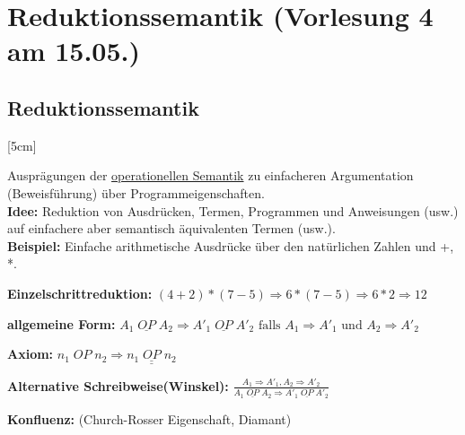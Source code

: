 \section{Reduktionssemantik \small(Vorlesung 4 am 15.05.)}
\subsection{Reduktionssemantik}
[5cm]

Ausprägungen der \underline{operationellen Semantik} zu einfacheren Argumentation (Beweisführung) über Programmeigenschaften.\\
\textbf{Idee:} Reduktion von Ausdrücken, Termen, Programmen und Anweisungen (usw.) auf einfachere aber semantisch äquivalenten Termen (usw.).\\
\textbf{Beispiel:} Einfache arithmetische Ausdrücke über den natürlichen Zahlen und +, *.
\begin{compactitem}
	\item[\textbf{Einzelschrittreduktion:}] $(4+2)*(7-5) \Rightarrow 6 * (7-5) \Rightarrow 6 * 2 \Rightarrow 12$
	\item[\textbf{allgemeine Form:}] $A_1\;\underline{OP}\;A_2 \Rightarrow A'_1\;\underline{OP}\;A'_2 \text{ falls } A_1 \Rightarrow A'_1 \text{ und } A_2 \Rightarrow A'_2$
	\item[\textbf{Axiom:}] $n_1\;OP\;n_2 \Rightarrow \underline{n_1\;\underline{OP}\;n_2}$
	\item[\textbf{Alternative Schreibweise(Winskel):}] $\frac {A_1 \Rightarrow A'_1, A_2 \Rightarrow A'_2} {A_1\;\underline{OP}\;A_2 \Rightarrow A'_1\;\underline{OP}\;A'_2}$
	\item[\textbf{Konfluenz:}] (Church-Rosser Eigenschaft, Diamant)\\
\end{compactitem}

